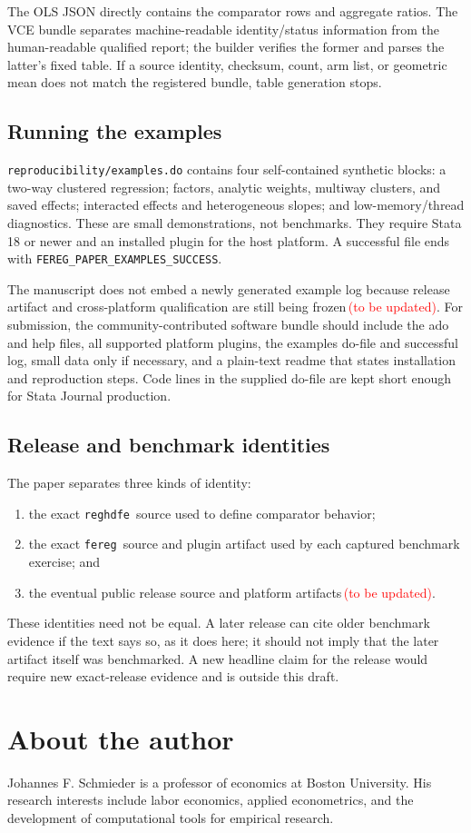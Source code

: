\documentclass[11pt]{article}
\newcommand{\fereg}{\texttt{fereg}}
\newcommand{\reghdfe}{\texttt{reghdfe}}
\newcommand{\tbu}{\textcolor{red}{\,(\textup{to be updated})}}
\begin{document}
The OLS JSON directly contains the comparator rows and aggregate ratios.  The
VCE bundle separates machine-readable identity/status information from the
human-readable qualified report; the builder verifies the former and parses
the latter's fixed table.  If a source identity, checksum, count, arm list, or
geometric mean does not match the registered bundle, table generation stops.

\subsection{Running the examples}

\texttt{reproducibility/examples.do} contains four self-contained synthetic
blocks: a two-way clustered regression; factors, analytic weights, multiway
clusters, and saved effects; interacted effects and heterogeneous slopes; and
low-memory/thread diagnostics.  These are small demonstrations, not
benchmarks.  They require Stata 18 or newer and an installed plugin for the
host platform.  A successful file ends with
\texttt{FEREG\_PAPER\_EXAMPLES\_SUCCESS}.

The manuscript does not embed a newly generated example log because release
artifact and cross-platform qualification are still being frozen\tbu.  For
submission, the community-contributed software bundle should include the ado
and help files, all supported platform plugins, the examples do-file and
successful log, small data only if necessary, and a plain-text readme that
states installation and reproduction steps.  Code lines in the supplied
do-file are kept short enough for Stata Journal production.

\subsection{Release and benchmark identities}

The paper separates three kinds of identity:
\begin{enumerate}
\item the exact \reghdfe\ source used to define comparator behavior;
\item the exact \fereg\ source and plugin artifact used by each captured
benchmark exercise; and
\item the eventual public release source and platform artifacts\tbu.
\end{enumerate}
These identities need not be equal.  A later release can cite older benchmark
evidence if the text says so, as it does here; it should not imply that the
later artifact itself was benchmarked.  A new headline claim for the release
would require new exact-release evidence and is outside this draft.




\section*{About the author}

Johannes F. Schmieder is a professor of economics at Boston University.  His
research interests include labor economics, applied econometrics, and the
development of computational tools for empirical research.
\end{document}
